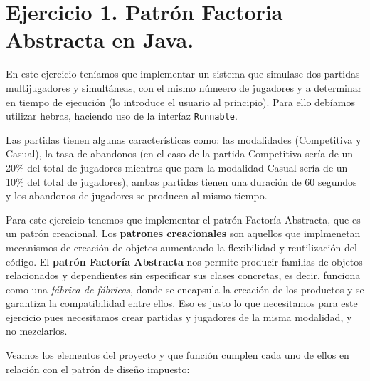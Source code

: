 \documentclass[a4paper,12pt]{article}
\begin{document}
		\newpage
	
	\section{Ejercicio 1. Patrón Factoria Abstracta en Java.}
		En este ejercicio teníamos que implementar  un sistema que simulase dos partidas multijugadores y simultáneas, con el mismo númeero de jugadores y a determinar en tiempo de ejecución (lo introduce el usuario al principio). Para ello debíamos utilizar hebras, haciendo uso de la interfaz \texttt{Runnable}. 
		
		Las partidas tienen algunas características como: las modalidades (Competitiva y Casual), la tasa de abandonos (en el caso de la partida Competitiva sería de un 20\% del total de jugadores mientras que para la modalidad Casual sería de un 10\% del total de jugadores), ambas partidas tienen una duración de 60 segundos y los abandonos de jugadores se producen al mismo tiempo.
		
		Para este ejercicio tenemos que implementar el patrón Factoría Abstracta, que es un patrón creacional. Los \textbf{patrones creacionales} son aquellos que implmenetan mecanismos de creación de objetos aumentando la flexibilidad y reutilización del código. El \textbf{patrón Factoría Abstracta} nos permite producir familias de objetos relacionados y dependientes sin especificar sus clases concretas, es decir, funciona como una \textit{fábrica de fábricas}, donde se encapsula la creación de los productos y se garantiza la compatibilidad entre ellos. Eso es justo lo que necesitamos para este ejercicio pues necesitamos crear partidas y jugadores de la misma modalidad, y no mezclarlos.
		
		Veamos los elementos del proyecto y que función cumplen cada uno de ellos en relación con el patrón de diseño impuesto:
		
\end{document}

